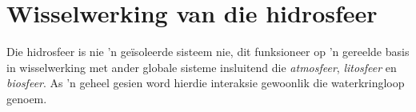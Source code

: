 
\section{Wisselwerking van die hidrosfeer}
            \nopagebreak

Die hidrosfeer is nie   'n geïsoleerde sisteem nie, dit funksioneer op   'n gereelde basis in wisselwerking met ander globale sisteme insluitend die \textsl{atmosfeer}, \textsl{litosfeer} en \textsl{biosfeer}. As   'n geheel gesien word hierdie interaksie gewoonlik die waterkringloop genoem.



